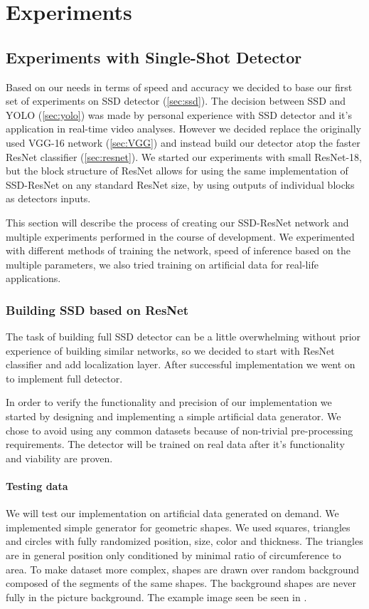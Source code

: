 \chapter*{Experiments}
\section{Experiments with Single-Shot Detector}
\label{chapt:experiments}
Based on our needs in terms of speed and accuracy we decided to base our first set of experiments on SSD detector (\cref{sec:ssd}). The decision between SSD and YOLO (\cref{sec:yolo}) was made by personal experience with SSD detector and it's application in real-time video analyses. However we decided replace the originally used VGG-16 network (\cref{sec:VGG}) and instead build our detector atop the faster ResNet classifier (\cref{sec:resnet}). We started our experiments with small ResNet-18, but the block structure of ResNet allows for using the same implementation of SSD-ResNet on any standard ResNet size, by using outputs of individual blocks as detectors inputs.

This section will describe the process of creating our SSD-ResNet network and multiple experiments performed in the course of development. We experimented with different methods of training the network, speed of inference based on the multiple parameters, we also tried training on artificial data for real-life applications.


\subsection{Building SSD based on ResNet}
The task of building full SSD detector can be a little overwhelming without prior experience of building similar networks, so we decided to start with ResNet classifier and add localization layer. After successful implementation we went on to implement full detector. 

In order to verify the functionality and precision of our implementation we started by designing and implementing a simple artificial data generator. We chose to avoid using any common datasets because of non-trivial pre-processing requirements. The detector will be trained on real data after it's functionality and viability are proven.

\subsubsection{Testing data}
We will test our implementation on artificial data generated on demand. We implemented simple generator for geometric shapes. We used squares, triangles and circles with fully randomized position, size, color and thickness. The triangles are in general position only conditioned by minimal ratio of circumference to area.
To make dataset more complex, shapes are drawn over random background composed of the segments of the same shapes. The background shapes are never fully in the picture background. The example image seen be seen in .



